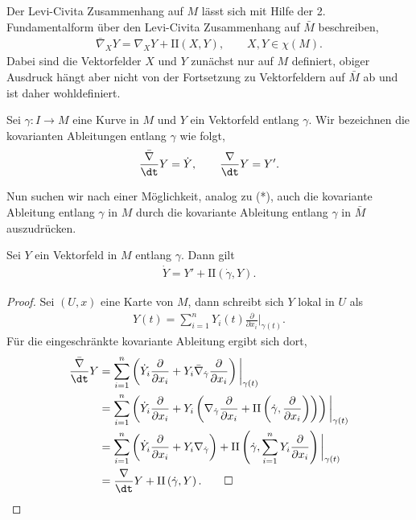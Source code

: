 \documentclass[%
	paper=a5,%
	fleqn,%
	DIV=18,%
	BCOR=0mm,
	fontsize=11pt,
	titlepage=false,%
	bibliography=totoc,
	DIV=18,%
	twoside=true,
	pdftitle=Riemannsche Geometrie,
	pdfauthor=Uwe Semmelmann,
	numbers=noendperiod]%
	{scrbook}
\begin{document}
\renewcommand{\II}{\mathrm{II}}

Der Levi-Civita Zusammenhang auf $M$ lässt sich mit Hilfe der 2. Fundamentalform über den Levi-Civita Zusammenhang auf $\bar{M}$ beschreiben,
\begin{align*}
\bar{\nabla}_{X}Y = \nabla_{X}Y + \II(X,Y),\qquad X,Y\in \chi(M).\tag{*}
\end{align*}
Dabei sind die Vektorfelder $X$ und $Y$ zunächst nur auf $M$ definiert, obiger Ausdruck hängt aber nicht von der Fortsetzung zu Vektorfeldern auf $\bar{M}$ ab und ist daher wohldefiniert.

Sei $\gamma: I\to M$ eine Kurve in $M$ und $Y$ ein Vektorfeld entlang $\gamma$. Wir bezeichnen die kovarianten Ableitungen entlang $\gamma$ wie folgt,
\begin{align*}
\frac{\bar{\nabla}}{\dt} Y = \dot{Y},\qquad
\frac{\nabla}{\dt} Y = Y'.
\end{align*}

Nun suchen wir nach einer Möglichkeit, analog zu (*), auch die kovariante Ableitung entlang $\gamma$  in $M$ durch die kovariante Ableitung entlang $\gamma$ in $\bar{M}$ auszudrücken.

\begin{lem}
Sei $Y$ ein Vektorfeld in $M$ entlang $\gamma$. Dann gilt
\begin{align*}
\dot{Y} = Y' + \II(\dot{\gamma},Y).
\end{align*}
\end{lem}
\begin{proof}
Sei $(U,x)$ eine Karte von $M$, dann schreibt sich $Y$ lokal in $U$ als
\begin{align*}
Y(t) = \sum_{i=1}^n Y_{i}(t) \frac{\partial}{\partial x_{i}}\bigg|_{\gamma(t)}.
\end{align*}
Für die eingeschränkte kovariante Ableitung ergibt sich dort,
\begin{align*}
\frac{\bar{\nabla}}{\dt} Y &= 
\sum_{i=1}^n \left( \dot{Y}_{i}\frac{\partial}{\partial x_{i}}
+
Y_{i} \bar{\nabla}_{\dot{\gamma}} \frac{\partial}{\partial x_{i}}\right)\bigg|_{\gamma(t)}\\
&= 
\sum_{i=1}^n \left( \dot{Y}_{i}\frac{\partial}{\partial x_{i}}
+
Y_{i} \left(\nabla_{\dot{\gamma}} \frac{\partial}{\partial x_{i}} + \II\left(\dot{\gamma},\frac{\partial}{\partial x_{i}}\right)\right)\right)\bigg|_{\gamma(t)}\\
&= 
\sum_{i=1}^n \left( \dot{Y}_{i}\frac{\partial}{\partial x_{i}}
+
Y_{i} \nabla_{\dot{\gamma}}\right) + \II \left(\dot{\gamma},\sum_{i=1}^n Y_{i}\frac{\partial}{\partial x_{i}}\right)\bigg|_{\gamma(t)}\\
&= 
\frac{\nabla}{\dt}Y + \II \left(\dot{\gamma},Y\right).\qed
\end{align*}
\end{proof}
\end{document}
